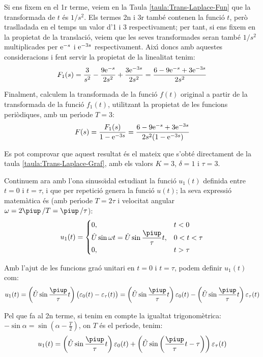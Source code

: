 \begin{exemple}
Si ens fixem en el 1r terme, veiem en la Taula
\vref{taula:Trans-Laplace-Fun} que la  transformada de $t$ \'{e}s $1/s^2$.
Els termes 2n i 3r tamb\'{e} contenen la funci\'{o} $t$, per\`{o} traslladada
en el temps un valor d'1 i 3 respectivament; per tant, si ens fixem
en la propietat de la translaci\'{o}, veiem que les seves transformades
seran tamb\'{e} $1/s^2$ multiplicades per $\mathrm{e}^{-s}$ i $\mathrm{e}^{-3s}$
respectivament. Aix\'{\i} doncs amb aquestes consideracions i fent
servir la propietat de la linealitat tenim:
\[
    F_1(s) = \frac{3}{s^2} - \frac{9 \mathrm{e}^{-s}}{2 s^2} + \frac{3 \mathrm{e}^{-3s}}{2
    s^2} =\frac{6-9\mathrm{e}^{-s}+3\mathrm{e}^{-3s}}{2s^2}
\]

Finalment, calculem la transformada de la funci\'{o} $f(t)$ original a
partir de la transformada de la funci\'{o} $f_1(t)$, utilitzant la
propietat de les funcions peri\`{o}diques, amb un per\'{\i}ode $T=3$:
\[
    F(s) = \frac{F_1(s)}{1-\mathrm{e}^{-3s}} = \frac{6-9\mathrm{e}^{-s}+3\mathrm{e}^{-3s}}{2s^2(1-\mathrm{e}^{-3s}) }
\]

Es pot comprovar que aquest resultat \'{e}s el mateix que s'obt\'{e} directament de la taula \vref{taula:Trans-Laplace-Graf}, amb els valors $K=3$, $\delta=1$ i $\tau=3$.

Continuem ara  amb l'ona sinuso\"{\i}dal estudiant la funci\'{o} $u_1(t)$
definida entre $t=0$ i $t=\tau$, i que per repetici\'{o} genera la
funci\'{o} $u(t)$; la seva expressi\'{o} matem\`{a}tica \'{e}s (amb per\'{\i}ode $T=
2\tau$ i velocitat angular $\omega= 2\piup\,/T  = \piup\,/\tau$):
\[
    u_1(t) = \begin{cases} 0, & t < 0\\ \hat{U}\sin\omega t =
    \hat{U}\sin\dfrac{\piup}{\tau}t,  & 0<t<\tau \\ 0, & t > \tau \end{cases}
\]


Amb l'ajut de les funcions gra\'{o} unitari en $t=0$ i $t=\tau$, podem
definir $u_1(t)$ com:
\[
    u_1(t)=\left(\hat{U}\sin\frac{\piup}{\tau}t\right)\bigl(\varepsilon_0(t)-\varepsilon_\tau(t)\bigr)
    =\left(\hat{U}\sin\frac{\piup}{\tau}t\right)\varepsilon_0(t) - \left(\hat{U}\sin\frac{\piup}{\tau}t\right)\varepsilon_\tau(t)
\]

Pel que fa al 2n  terme, si tenim en compte la igualtat
trigonom\`{e}trica: $-\sin \alpha = \sin(\alpha-\frac{T}{2})$, on $T$ \'{e}s
el per\'{\i}ode, tenim:
\[
    u_1(t) = \left(\hat{U}\sin\frac{\piup}{\tau}t\right)\varepsilon_0(t) +
    \left(\hat{U}\sin\left(\frac{\piup}{\tau}t-\tau\right)\right)\varepsilon_\tau(t)
\]


\end{exemple}

